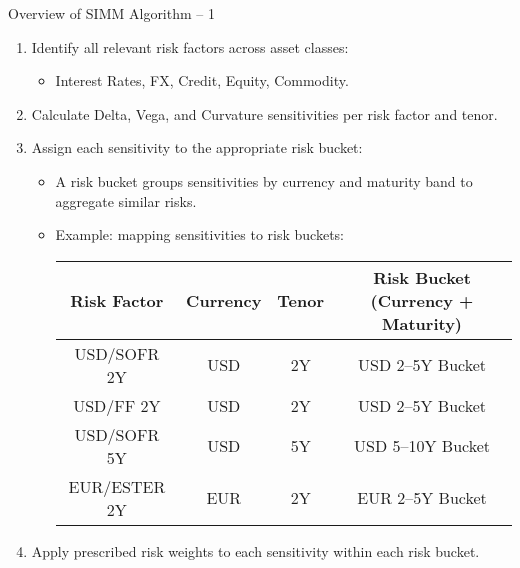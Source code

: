 \documentclass[handout, aspectratio=169]{beamer}
\begin{document}
\begin{frame}{Overview of SIMM Algorithm – 1}
  \begin{enumerate}
      \item Identify all relevant risk factors across asset classes:
      \begin{itemize}
          \item Interest Rates, FX, Credit, Equity, Commodity.
      \end{itemize}
      \item Calculate Delta, Vega, and Curvature sensitivities per risk factor and tenor.
      \item Assign each sensitivity to the appropriate risk bucket:
      \begin{itemize}
        \item A risk bucket groups sensitivities by currency and maturity band to aggregate similar risks.
        \item Example: mapping sensitivities to risk buckets:
        \begin{table}[h!]
        \centering
        \small
        \begin{tabular}{|c|c|c|c|}
        \hline
        \textbf{Risk Factor} & \textbf{Currency} & \textbf{Tenor} & \textbf{Risk Bucket (Currency + Maturity)} \\
        \hline
        USD/SOFR 2Y & USD & 2Y & USD 2–5Y Bucket \\
        USD/FF 2Y & USD & 2Y & USD 2–5Y Bucket \\
        USD/SOFR 5Y & USD & 5Y & USD 5–10Y Bucket \\
        EUR/ESTER 2Y & EUR & 2Y & EUR 2–5Y Bucket \\
        \hline
        \end{tabular}
        \end{table}
      \end{itemize}
      \item Apply prescribed risk weights to each sensitivity within each risk bucket.
  \end{enumerate}
\end{frame}
\end{document}

